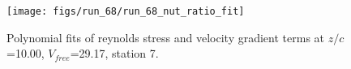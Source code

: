 \begin{figure}[H]
\centering
\texttt{[image: figs/run\_68/run\_68\_nut\_ratio\_fit]}
\caption{Polynomial fits of reynolds stress and velocity gradient terms at $z/c$=10.00, $V_{free}$=29.17, station 7.}
\label{fig:run_68_nut_ratio_fit}
\end{figure}


